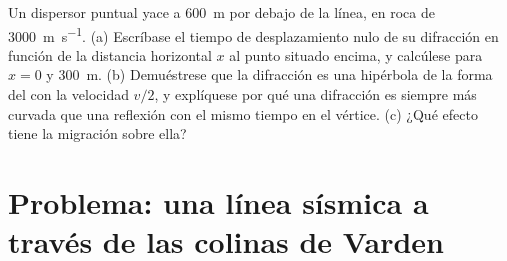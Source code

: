 \begin{exercise}[$\star\star\star$]\label{exo:b3:exploration-seismology:12}
Un dispersor puntual yace a \qty{600}{m} por debajo de la línea, en roca de
\qty{3000}{m.s^{-1}}. (a) Escríbase el tiempo de desplazamiento nulo de su difracción en función de
la distancia horizontal $x$ al punto situado encima, y calcúlese para $x = 0$
y \qty{300}{m}. (b) Demuéstrese que la difracción es una hipérbola de la forma del
 con la velocidad $v/2$, y explíquese por qué una difracción es siempre más curvada que una
reflexión con el mismo tiempo en el vértice. (c) ¿Qué efecto tiene la migración sobre ella?
\end{exercise}

\section{Problema: una línea sísmica a través de las colinas de Varden}

